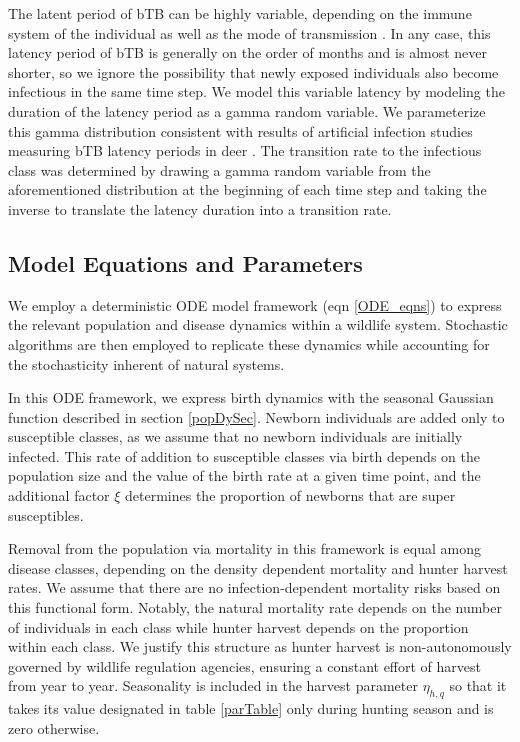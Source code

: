 \documentclass[number,preprint,review,12pt]{elsarticle}
\begin{document}
The latent period of bTB can be highly variable, depending on the immune system of the individual as well as the mode of transmission \citep{brooks-pollock}. In any case, this latency period of bTB is generally on the order of months and is almost never shorter, so we ignore the possibility that newly exposed individuals also become infectious in the same time step. We model this variable latency by modeling the duration of the latency period as a gamma random variable. We parameterize this gamma distribution consistent with results of artificial infection studies measuring bTB latency periods in deer \citep{Palmer2003, Palmer2002a}. The transition rate to the infectious class was determined by drawing a gamma random variable from the aforementioned distribution at the beginning of each time step and taking the inverse to translate the latency duration into a transition rate. 

\subsection{Model Equations and Parameters}
\doublespacing
We employ a deterministic ODE model framework (eqn \ref{ODE_eqns}) to express the relevant population  and disease dynamics within a wildlife system. Stochastic algorithms are then employed to replicate these dynamics while accounting for the stochasticity inherent of natural systems. 

In this ODE framework, we express birth dynamics with the seasonal Gaussian function described in section \ref{popDySec}. Newborn individuals are added only to susceptible classes, as we assume that no newborn individuals are initially infected. This rate of addition to susceptible classes via birth depends on the population size and the value of the birth rate at a given time point, and the additional factor $\xi$ determines the proportion of newborns that are super susceptibles.

Removal from the population via mortality in this framework is equal among disease classes, depending on the density dependent mortality and hunter harvest rates. We assume that there are no infection-dependent mortality risks based on this functional form. Notably, the natural mortality rate depends on the number of individuals in each class while hunter harvest depends on the proportion within each class. We justify this structure as hunter harvest is non-autonomously governed by wildlife regulation agencies, ensuring a constant effort of harvest from year to year. Seasonality is included in the harvest parameter $\eta_{h,q}$ so that it takes its value designated in table \ref{parTable} only during hunting season and is zero otherwise.
\end{document}
